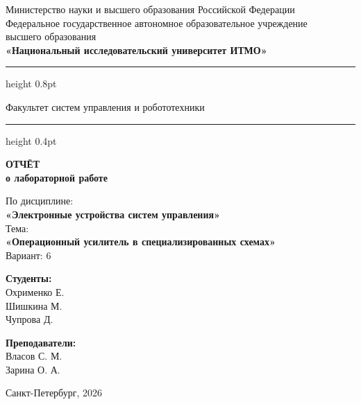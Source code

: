 \documentclass[a4paper,12pt]{article}
\begin{document}
	
	\begin{titlepage}
		\centering
		
		\vspace*{0.5cm}
		{\small
			Министерство науки и высшего образования Российской Федерации\\[2pt]
			Федеральное государственное автономное образовательное учреждение\\
			высшего образования\\[2pt]
			\textbf{«Национальный исследовательский университет ИТМО»}\\
		}
		
		\vspace{0.8cm}
		\hrule height 0.8pt
		\vspace{0.3cm}
		
		{\large Факультет систем управления и робототехники}
		
		\vspace{0.3cm}
		\hrule height 0.4pt
		\vspace{2.5cm}
		
		{\Huge\bfseries ОТЧЁТ}\\[0.4cm]
		{\LARGE\bfseries о лабораторной работе}\\[0.8cm]
		
		\begin{tcolorbox}[
			colback=gray!4,
			colframe=gray!10,
			boxrule=0.8pt,
			arc=4pt,
			left=12pt, right=12pt, top=8pt, bottom=8pt
			]
			\centering
			{\large По дисциплине:\\[4pt]}
			{\large\bfseries «Электронные устройства систем управления»}\\[10pt]
			{\large Тема:\\[4pt]}
			{\large\bfseries «Операционный усилитель в специализированных схемах»} \\[10pt]
			{\large Вариант: 6}
		\end{tcolorbox}
		
		\vspace{3cm}
		
		\begin{minipage}{0.45\textwidth}
			\raggedright
			{\large\bfseries Студенты:}\\[4pt]
				Охрименко Е. \\
				Шишкина М. \\
				Чупрова Д. \\
		\end{minipage}
		\hfill
		\begin{minipage}{0.45\textwidth}
			\raggedleft
			{\large\bfseries Преподаватели:}\\[4pt]
			Власов С. М. \\
			Зарина О. А.
		\end{minipage}
		
		\vfill
		\vspace{0.4cm}
		{\large Санкт-Петербург, 2026}
	\end{titlepage}
	
\end{document}
